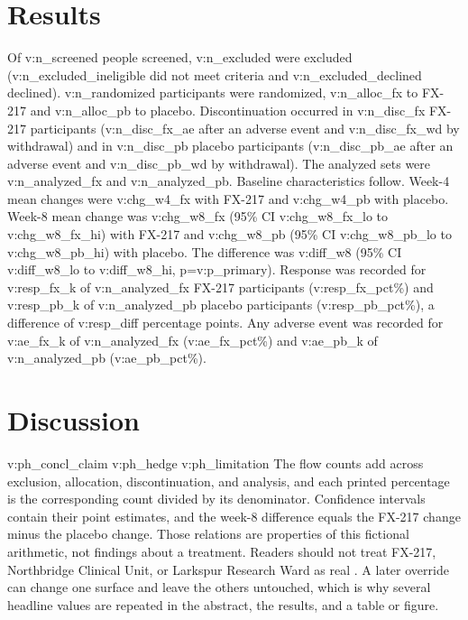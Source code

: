 \documentclass[11pt]{article}
\begin{document}
\section{Results}
Of {{v:n_screened}} people screened, {{v:n_excluded}} were excluded
({{v:n_excluded_ineligible}} did not meet criteria and {{v:n_excluded_declined}} declined).
{{v:n_randomized}} participants were randomized, {{v:n_alloc_fx}} to FX-217 and {{v:n_alloc_pb}} to placebo.
Discontinuation occurred in {{v:n_disc_fx}} FX-217 participants
({{v:n_disc_fx_ae}} after an adverse event and {{v:n_disc_fx_wd}} by withdrawal)
and in {{v:n_disc_pb}} placebo participants
({{v:n_disc_pb_ae}} after an adverse event and {{v:n_disc_pb_wd}} by withdrawal).
The analyzed sets were {{v:n_analyzed_fx}} and {{v:n_analyzed_pb}}.
Baseline characteristics follow.
Week-4 mean changes were {{v:chg_w4_fx}} with FX-217 and {{v:chg_w4_pb}} with placebo.
Week-8 mean change was {{v:chg_w8_fx}} (95\% CI {{v:chg_w8_fx_lo}} to {{v:chg_w8_fx_hi}}) with FX-217
and {{v:chg_w8_pb}} (95\% CI {{v:chg_w8_pb_lo}} to {{v:chg_w8_pb_hi}}) with placebo.
The difference was {{v:diff_w8}} (95\% CI {{v:diff_w8_lo}} to {{v:diff_w8_hi}}, p={{v:p_primary}}).
Response was recorded for {{v:resp_fx_k}} of {{v:n_analyzed_fx}} FX-217 participants ({{v:resp_fx_pct}}\%)
and {{v:resp_pb_k}} of {{v:n_analyzed_pb}} placebo participants ({{v:resp_pb_pct}}\%),
a difference of {{v:resp_diff}} percentage points.
Any adverse event was recorded for {{v:ae_fx_k}} of {{v:n_analyzed_fx}} ({{v:ae_fx_pct}}\%)
and {{v:ae_pb_k}} of {{v:n_analyzed_pb}} ({{v:ae_pb_pct}}\%).
\section{Discussion}
{{v:ph_concl_claim}}
{{v:ph_hedge}}
{{v:ph_limitation}}
The flow counts add across exclusion, allocation, discontinuation, and analysis, and each printed percentage is the corresponding count divided by its denominator.
Confidence intervals contain their point estimates, and the week-8 difference equals the FX-217 change minus the placebo change.
Those relations are properties of this fictional arithmetic, not findings about a treatment.
Readers should not treat FX-217, Northbridge Clinical Unit, or Larkspur Research Ward as real \cite{chen2022}.
A later override can change one surface and leave the others untouched, which is why several headline values are repeated in the abstract, the results, and a table or figure.
\falsifybibliography
\end{document}
